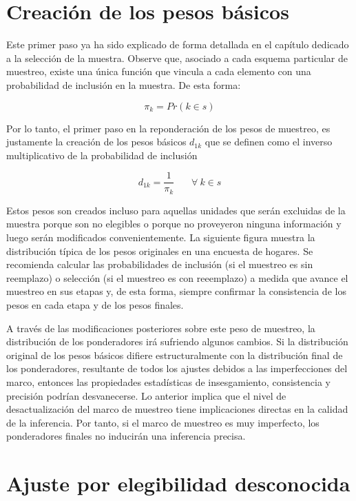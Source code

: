 \documentclass[
  12pt,
]{book}
\begin{document}
\hypertarget{creaciuxf3n-de-los-pesos-buxe1sicos}{%
\section{Creación de los pesos básicos}\label{creaciuxf3n-de-los-pesos-buxe1sicos}}

Este primer paso ya ha sido explicado de forma detallada en el capítulo dedicado a la selección de la muestra. Observe que, asociado a cada esquema particular de muestreo, existe una única función que vincula a cada elemento con una probabilidad de inclusión en la muestra. De esta forma:

\[\pi_k = Pr (k \in s)\]

Por lo tanto, el primer paso en la reponderación de los pesos de muestreo, es justamente la creación de los pesos básicos \(d_{1k}\) que se definen como el inverso multiplicativo de la probabilidad de inclusión

\[d_{1k} = \frac{1}{\pi_k}  \ \ \ \ \ \ \ \ \forall \ k\in s\]

Estos pesos son creados incluso para aquellas unidades que serán excluidas de la muestra porque son no elegibles o porque no proveyeron ninguna información y luego serán modificados convenientemente. La siguiente figura muestra la distribución típica de los pesos originales en una encuesta de hogares. Se recomienda calcular las probabilidades de inclusión (si el muestreo es sin reemplazo) o selección (si el muestreo es con reeemplazo) a medida que avance el muestreo en sus etapas y, de esta forma, siempre confirmar la consistencia de los pesos en cada etapa y de los pesos finales.

A través de las modificaciones posteriores sobre este peso de muestreo, la distribución de los ponderadores irá sufriendo algunos cambios. Si la distribución original de los pesos básicos difiere estructuralmente con la distribución final de los ponderadores, resultante de todos los ajustes debidos a las imperfecciones del marco, entonces las propiedades estadísticas de insesgamiento, consistencia y precisión podrían desvanecerse. Lo anterior implica que el nivel de desactualización del marco de muestreo tiene implicaciones directas en la calidad de la inferencia. Por tanto, si el marco de muestreo es muy imperfecto, los ponderadores finales no inducirán una inferencia precisa.

\hypertarget{ajuste-por-elegibilidad-desconocida}{%
\section{Ajuste por elegibilidad desconocida}\label{ajuste-por-elegibilidad-desconocida}}
\end{document}
